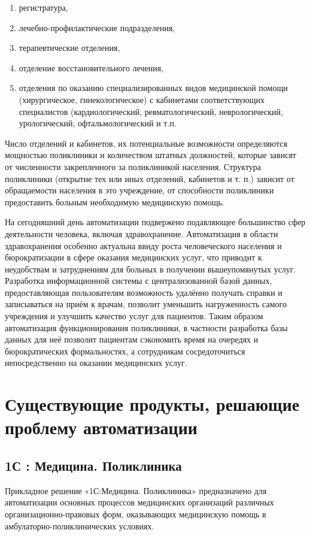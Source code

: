 \documentclass[14pt,a4paper,russian]{extreport}
\begin{document}
\begin{enumerate}[noitemsep]
    \item регистратура,
    \item лечебно-профилактические подразделения,
    \item терапевтические отделения,
    \item отделение восстановительного лечения,
    \item отделения по оказанию специализированных видов медицинской помощи (хирургическое,
        гинекологическое) с кабинетами соответствующих специалистов (кардиологический,
        ревматологический, неврологический, урологический, офтальмологический и т.п.
        
\end{enumerate}

Число отделений и кабинетов, их потенциальные возможности определяются мощностью поликлиники и
количеством штатных должностей, которые зависят от численности закрепленного за
поликлиникой населения. Структура поликлиники (открытие тех или иных отделений, кабинетов и
т. п.) зависит от обращаемости населения в это учреждение, от способности поликлиники предоставить
больным необходимую медицинскую помощь.\cite{medstat}

На сегодняшний день автоматизации подвержено подавляющее большинство сфер деятельности человека,
включая здравохранение. Автоматизация в области здравохранения особенно актуальна ввиду роста человеческого населения
и бюрократизации в сфере оказания медицинских услуг, что приводит к неудобствам и
затруднениям для больных
в получении вышеупомянутых услуг. Разработка информационной системы с
централизованной базой данных, предоставляющая пользователям возможность удалённо получать справки и записываться
на приём к
врачам, позволит уменьшить нагруженность самого учреждения и улучшить качество услуг для
пациентов. Таким образом автоматизация функционирования
поликлиники, в частности разработка базы данных для неё позволит пациентам сэкономить время на
очередях и бюрократических формальностях, а сотрудникам сосредоточиться непосредственно на
оказании медицинских услуг.


\section{Существующие продукты, решающие проблему автоматизации}

\subsection{1С : Медицина. Поликлиника}
Прикладное решение «1С:Медицина. Поликлиника» предназначено для автоматизации основных процессов
медицинских организаций различных организационно-правовых форм, оказывающих медицинскую помощь в
амбулаторно-поликлинических условиях. 
\end{document}
